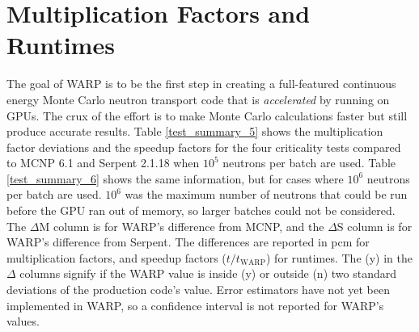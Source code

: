 \section{Multiplication Factors and Runtimes}

The goal of WARP is to be the first step in creating a full-featured continuous energy Monte Carlo neutron transport code that is \emph{accelerated} by running on GPUs.  The crux of the effort is to make Monte Carlo calculations faster but still produce accurate results.  Table \ref{test_summary_5} shows the multiplication factor deviations and the speedup factors for the four criticality tests compared to MCNP 6.1 and Serpent 2.1.18 when $10^5$ neutrons per batch are used.  Table  \ref{test_summary_6} shows the same information, but for cases where $10^6$ neutrons per batch are used.  $10^6$ was the maximum number of neutrons that could be run before the GPU ran out of memory, so larger batches could not be considered.  The $\Delta$M column is for WARP's difference from MCNP, and the $\Delta$S column is for WARP's difference from Serpent.  The differences are reported in pcm for multiplication factors, and speedup factors ($t/t_\mathrm{WARP}$) for runtimes.  The (y) in the $\Delta$ columns signify if the WARP value is inside (y) or outside (n) two standard deviations of the production code's value. Error estimators have not yet been implemented in WARP, so a confidence interval is not reported for WARP's values.

